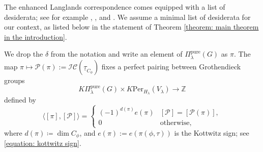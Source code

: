 \documentclass[11pt,letterpaper]{amsart}
\newcommand{\rev}[1]{{\color{red}#1}}
\newcommand{\revnote}[1]{{\color{red}[\textsf{\textbf{note:}} #1]}}
\newcommand{\pure}{\mathrm{pure}}
\newcommand{\Per}{\mathrm{Per}}
\newcommand{\locsys}[2]{\underline{#1}_{#2}}
\renewcommand{\1}{\mathbbm{1}}
\numberwithin{equation}{section}
\begin{document}
The enhanced Langlands correspondence comes equipped with a list of desiderata; see for example  {\cite{Bor79}, \cite{Vog93}, \cite{Kal16} and \cite{AMS18}}. We assume a minimal list of desiderata for our context, as listed below in the statement of Theorem \ref{theorem: main theorem in the introduction}.

We drop the $\delta$ from the notation and write an element of $\Pi_\lambda^\pure(G)$ as $\pi$. The map $\pi \mapsto \mathcal{P}(\pi):=\mathcal{IC}(\locsys{\tau}{C_\phi})$ fixes a perfect pairing between Grothendieck groups
\[
    K\Pi^\pure_\lambda(G) \times K\Per_{H_\lambda}(V_\lambda) \to \mathbb{Z}
\]
defined by
\begin{equation}\label{equation: pairing in the introduction}
\langle [\pi],[\mathcal{P}]\rangle =
\begin{cases}
    (-1)^{d(\pi)}e(\pi) & [\mathcal{P}] = [\mathcal{P}(\pi)],\\
    0 & \text{otherwise},
\end{cases}
\end{equation}
where $d(\pi) \coloneqq \dim C_{\phi}$, and $e(\pi):=e(\pi(\phi,\tau))$ is the Kottwitz sign; see  {\eqref{equation: kottwitz sign}}. 
\end{document}
